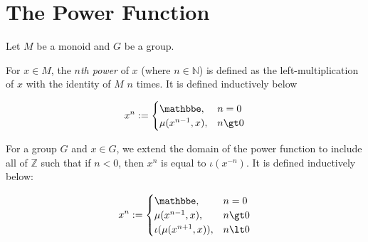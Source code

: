 \section{The Power Function}

Let $M$ be a monoid and $G$ be a group.

\begin{definition}
    \label{definition : mpow}
    \leanok
    For $x \in M$, the \textit{$n$th power} of $x$ (where $n \in \mathbb{N}$) is defined as the left-multiplication of $x$ with the identity of $M$ $n$ times. It is defined inductively below

    \begin{equation*}
        x^n := \begin{cases}
            \mathbbe, & n = 0 \\
            \mu(x^{n-1}, x), & n \gt 0
        \end{cases}
    \end{equation*}
\end{definition}

\begin{definition}
    \label{definition : gpow}
    \leanok
    For a group $G$ and $x \in G$, we extend the domain of the power function to include all of $\mathbb{Z}$ such that if $n \lt 0$, then $x^n$ is equal to $\iota(x^{-n})$. It is defined inductively below:

    \begin{equation*}
        x^n := \begin{cases}
            \mathbbe, & n = 0 \\
            \mu(x^{n-1}, x), & n \gt 0 \\
            \iota(\mu(x^{n+1}, x)), & n \lt 0
        \end{cases}
    \end{equation*}
\end{definition}
